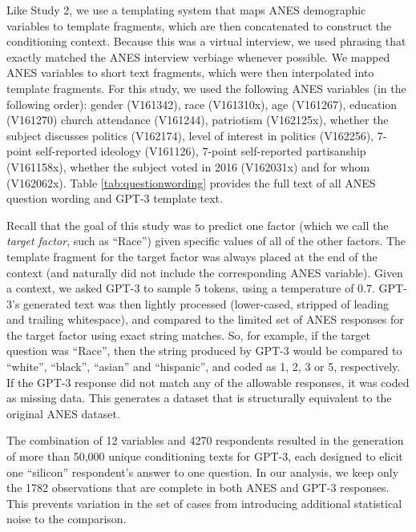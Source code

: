 \documentclass[11pt]{article}
\begin{document}
Like Study 2, we use a templating system that maps ANES demographic variables to template fragments, which are then concatenated to construct the conditioning context.  Because this was a virtual interview, we used phrasing that exactly matched the ANES interview verbiage whenever possible.  We mapped ANES variables to short text fragments, which were then interpolated into template fragments.
For this study, we used the following ANES variables (in the following order):
gender (V161342),
race (V161310x),
age (V161267),
education (V161270)
church attendance (V161244),
patriotism (V162125x),
whether the subject discusses politics (V162174),
level of interest in politics (V162256),
7-point self-reported ideology (V161126),
7-point self-reported partisanship (V161158x),
whether the subject voted in 2016 (V162031x) and for whom (V162062x). Table \ref{tab:questionwording} provides the full text of all ANES question wording and GPT-3 template text.

Recall that the goal of this study was to predict one factor (which we call the \emph{target factor}, such as ``Race'') given specific values of all of the other factors.  The template fragment for the target factor was always placed at the end of the context (and naturally did not include the corresponding ANES variable).  Given a context, we asked GPT-3 to sample 5 tokens, using a temperature of 0.7.  GPT-3's generated text was then lightly processed (lower-cased, stripped of leading and trailing whitespace), and compared to the limited set of ANES responses for the target factor using exact string matches.  So, for example, if the target question was ``Race'', then the string produced by GPT-3 would be compared to ``white'', ``black'', ``asian'' and ``hispanic'', and coded as 1, 2, 3 or 5, respectively.  If the GPT-3 response did not match any of the allowable responses, it was coded as missing data. This generates a dataset that is structurally equivalent to the original ANES dataset.

The combination of 12 variables and 4270 respondents resulted in the generation of more than 50,000 unique conditioning texts for GPT-3, each designed to elicit one ``silicon'' respondent's answer to one question. In our analysis, we keep only the 1782 observations that are complete in both ANES and GPT-3 responses. This prevents variation in the set of cases from introducing additional statistical noise to the comparison.

\newpage
\end{document}
